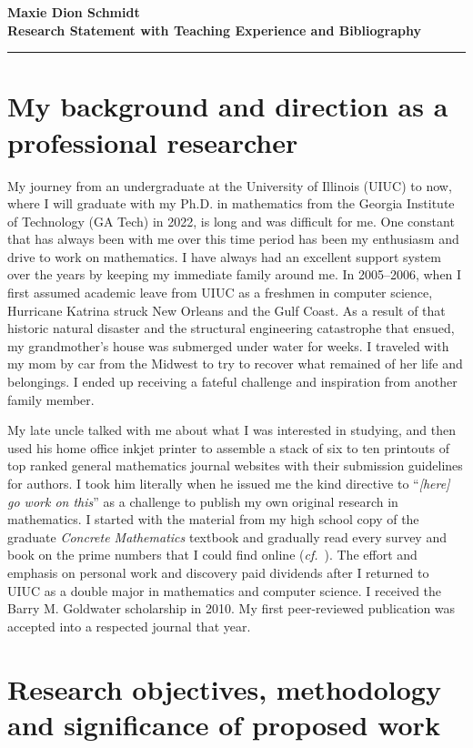\documentclass[10pt,reqno,letterpaper]{article}
\theoremstyle{plain}
\numberwithin{theorem}{section}
\theoremstyle{definition}
\newcommand{\cf}[0]{\emph{cf.}\ }
\begin{document}
\noindent
{\bfseries\Large Maxie Dion Schmidt} \\[0.5ex]
{\bfseries\Large Research Statement with Teaching Experience and Bibliography} \\ 
\hrule\medskip

\section{My background and direction as a professional researcher}

My journey from an undergraduate at the University of Illinois (UIUC) to now, 
where I will graduate with my Ph.D. in mathematics from the 
Georgia Institute of Technology (GA Tech) in 2022, 
is long and was difficult for me. 
One constant that has always been with me over this time period has been my 
enthusiasm and drive to work on mathematics. 
I have always had an excellent support system over the years 
by keeping my immediate family around me. 
In 2005--2006, when I first assumed academic leave from UIUC as a freshmen in computer science, 
Hurricane Katrina struck New Orleans and the Gulf Coast. 
As a result of that historic natural disaster and the 
structural engineering catastrophe that ensued, my grandmother's house 
was submerged under water for weeks. I traveled with my mom by car from the Midwest to try to 
recover what remained of her life and belongings. I ended up 
receiving a fateful challenge and inspiration from another family member. 

My late uncle talked with me about what I was interested in studying, and then used 
his home office inkjet printer to assemble a stack of six to ten printouts of top ranked general 
mathematics journal websites with their submission guidelines for authors. 
I took him literally when he issued me the kind directive to ``\emph{[here] go work on this}'' as a challenge 
to publish my own original research in mathematics. 
I started with the material from my high school copy of the graduate 
\emph{Concrete Mathematics} textbook \cite{GKP} and gradually 
read every survey and book on the prime numbers that I could find online 
(\cf \cite{PRIMEREC}). 
The effort and emphasis on personal work and 
discovery paid dividends after I returned 
to UIUC as a double major in mathematics and computer science. 
I received the Barry M. Goldwater scholarship in 2010. 
My first peer-reviewed publication was accepted into a respected journal that year. 
 
\section{Research objectives, methodology and significance of proposed work} 
\label{Section_SummaryOfPriorWork} 
\end{document}

